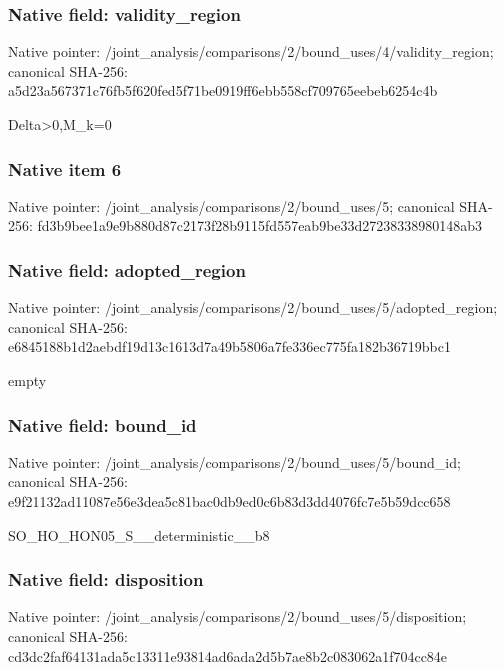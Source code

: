 \documentclass[10pt,a4paper]{article}
\begin{document}
\subsubsection{Native field: validity\_\allowbreak{}region}
Native pointer: /joint\_\allowbreak{}analysis/comparisons/2/bound\_\allowbreak{}uses/4/validity\_\allowbreak{}region; canonical SHA-256: a5d23a567371c76fb5f620fed5f71be0919ff6ebb558cf709765eebeb6254c4b

\begingroup\raggedright\sloppy Delta>0,\allowbreak{}M\_\allowbreak{}k=\allowbreak{}0\par\endgroup

\subsubsection{Native item 6}
Native pointer: /joint\_\allowbreak{}analysis/comparisons/2/bound\_\allowbreak{}uses/5; canonical SHA-256: fd3b9bee1a9e9b880d87c2173f28b9115fd557eab9be33d27238338980148ab3

\subsubsection{Native field: adopted\_\allowbreak{}region}
Native pointer: /joint\_\allowbreak{}analysis/comparisons/2/bound\_\allowbreak{}uses/5/adopted\_\allowbreak{}region; canonical SHA-256: e6845188b1d2aebdf19d13c1613d7a49b5806a7fe336ec775fa182b36719bbc1

\begingroup\raggedright\sloppy empty\par\endgroup

\subsubsection{Native field: bound\_\allowbreak{}id}
Native pointer: /joint\_\allowbreak{}analysis/comparisons/2/bound\_\allowbreak{}uses/5/bound\_\allowbreak{}id; canonical SHA-256: e9f21132ad11087e56e3dea5c81bac0db9ed0c6b83d3dd4076fc7e5b59dcc658

\begingroup\raggedright\sloppy SO\_\allowbreak{}HO\_\allowbreak{}HON05\_\allowbreak{}S\_\allowbreak{}\_\allowbreak{}deterministic\_\allowbreak{}\_\allowbreak{}b8\par\endgroup

\subsubsection{Native field: disposition}
Native pointer: /joint\_\allowbreak{}analysis/comparisons/2/bound\_\allowbreak{}uses/5/disposition; canonical SHA-256: cd3dc2faf64131ada5c13311e93814ad6ada2d5b7ae8b2c083062a1f704cc84e
\end{document}
